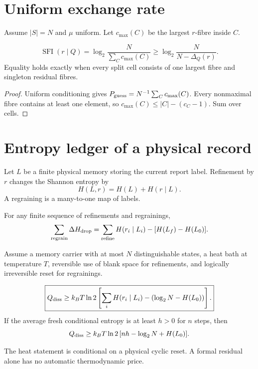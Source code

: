 \documentclass[11pt,a4paper]{article}
\begin{document}
\section{Uniform exchange rate}
Assume $|S|=N$ and $\mu$ uniform. Let $c_{\max}(C)$ be the largest $r$-fibre inside $C$.
\begin{theorem}
\begin{equation}
\operatorname{SFI}(r\mid Q)=\log_2\frac{N}{\sum_Cc_{\max}(C)}
\ge\log_2\frac{N}{N-\Delta_Q(r)}.
\end{equation}
Equality holds exactly when every split cell consists of one largest fibre and singleton residual fibres.
\end{theorem}
\begin{proof}
Uniform conditioning gives $P_{\rm guess}=N^{-1}\sum_Cc_{\max}(C)$. Every nonmaximal fibre contains at least one element, so $c_{\max}(C)\le|C|-(c_C-1)$. Sum over cells.
\end{proof}

\section{Entropy ledger of a physical record}
Let $L$ be a finite physical memory storing the current report label. Refinement by $r$ changes the Shannon entropy by
\begin{equation}
H(L,r)=H(L)+H(r\mid L).
\end{equation}
A regraining is a many-to-one map of labels.
\begin{lemma}
For any finite sequence of refinements and regrainings,
\begin{equation}
\sum_{\rm regrain}\Delta H_{\rm drop}
=\sum_{\rm refine}H(r_i\mid L_i)-[H(L_f)-H(L_0)].
\end{equation}
\end{lemma}
Assume a memory carrier with at most $N$ distinguishable states, a heat bath at temperature $T$, reversible use of blank space for refinements, and logically irreversible reset for regrainings.
\begin{theorem}
\begin{equation}
\boxed{Q_{\rm diss}\ge k_BT\ln2\left[\sum_iH(r_i\mid L_i)-(\log_2N-H(L_0))\right].}
\end{equation}
If the average fresh conditional entropy is at least $h>0$ for $n$ steps, then
\begin{equation}
Q_{\rm diss}\ge k_BT\ln2\,[nh-\log_2N+H(L_0)].
\end{equation}
\end{theorem}
The heat statement is conditional on a physical cyclic reset. A formal residual alone has no automatic thermodynamic price.
\end{document}
